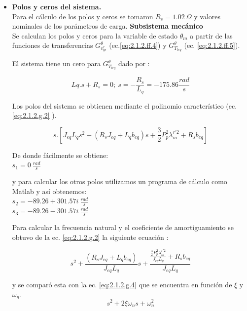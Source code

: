 \documentclass[10pt]{article}
\begin{document}
\begin{itemize} 
\item \textbf{Polos y ceros del sistema.}\\
Para el cálculo de los polos y ceros se tomaron $R_{s}=1.02\ \Omega $ y valores nominales de los parámetros de carga.
\subitem \textbf{Subsistema mecánico}\\
Se calculan los polos y ceros para la variable de estado $\theta_{m}$ a partir de las funciones de transferencias $G^{\theta}_{v^{r}_{qs}}$ (ec.\ref{eq:2.1.2.ff.4}) y $G^{\theta}_{T_{leq}}$ (ec. \ref{eq:2.1.2.ff.5}).
 
El sistema tiene un cero para $G^{\theta}_{T_{leq}}$ dado por :

	\begin{equation}
	Lq . s + R_{s}=0; \ s=-\frac{R_{s}}{L_{q}} = -175.86 \frac{rad}{s}
	\label{eq:2.1.2.g.1}
	\end{equation}
	
Los polos del sistema se obtienen mediante el polinomio característico (ec. \ref{eq:2.1.2.g.2} ).

	\begin{equation}
	s.[J_{eq}L_{q}s^{2}+(R_{s}J_{eq}+L_{q}b_{eq})s + \frac{3}{2}P_{p}^{2}\lambda ^{r'2}_{m}+R_{s}b_{eq}]
	\label{eq:2.1.2.g.2}
	\end{equation}
	
De donde fácilmente se obtiene:\\
$s_{1}=0\ \frac{rad}{s}$

y para calcular los otros polos utilizamos un programa de cálculo como Matlab y así obtenemos:\\
$s_{2}=-89.26 + 301.57 i\ \frac{rad}{s}$\\
$s_{3}=-89.26 - 301.57 i\ \frac{rad}{s}$

Para calcular la frecuencia natural y el coeficiente de amortiguamiento se obtuvo de la ec. \ref{eq:2.1.2.g.2} la siguiente ecuación :

	\begin{equation}
	s^{2}+\frac{(R_{s}J_{eq}+L_{q}b_{eq})}{J_{eq}L_{q}}s +\frac{\frac{ \frac{3}{2}P_{p}^{2}\lambda ^{r'2}_{m}}{J_{eq}L_{q}}+R_{s}b_{eq}}{J_{eq}L_{q}}
	\label{eq:2.1.2.g.3}
	\end{equation}
	
y se comparó esta con la ec. \ref{eq:2.1.2.g.4} que se encuentra en función de $\xi$ y $\omega_{n}$.
	\begin{equation}
	s^{2}+2\xi \omega_{n} s + \omega_{n}^2 
	\label{eq:2.1.2.g.4}
	\end{equation}


\end{itemize}
\end{document}
